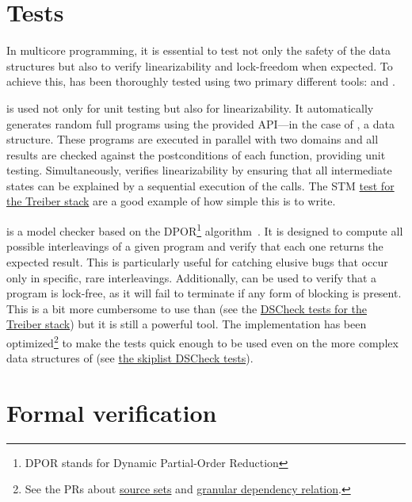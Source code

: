 \documentclass[a4paper, 11pt]{article}
\begin{document}
\section{Tests}

In multicore programming, it is essential to test not only the safety of the data structures but also to verify linearizability and lock-freedom when expected.
To achieve this, \Saturn has been thoroughly tested using two primary different tools: \DSCheck and \STM.

\STM is used not only for unit testing but also for linearizability.
It automatically generates random full programs using the provided API---in the case of \Saturn, a data structure.
These programs are executed in parallel with two domains and all results are checked against the postconditions of each function, providing unit testing.
Simultaneously, \STM verifies linearizability by ensuring that all intermediate states can be explained by a sequential execution of the calls. The STM \href{https://github.com/ocaml-multicore/saturn/blob/main/test/treiber_stack/stm_treiber_stack.ml}{test for the Treiber stack} are a good example of how simple this is to write.

\DSCheck is a model checker based on the DPOR\footnote[3]{DPOR stands for Dynamic Partial-Order Reduction} algorithm~\cite{dpor05}.
It is designed to compute all possible interleavings of a given program and verify that each one returns the expected result.
This is particularly useful for catching elusive bugs that occur only in specific, rare interleavings.
Additionally, \DSCheck can be used to verify that a program is lock-free, as it will fail to terminate if any form of blocking is present. This is a bit more cumbersome to use than \STM (see the \href{https://github.com/ocaml-multicore/saturn/blob/main/test/treiber_stack/treiber_stack_dscheck.ml}{DSCheck tests for the Treiber stack}) but it is still a powerful tool. The implementation has been optimized\footnote[4]{See the PRs about \href{https://github.com/ocaml-multicore/dscheck/pull/18}{source sets} and \href{https://github.com/ocaml-multicore/dscheck/pull/22}{granular dependency relation}.} to make the tests quick enough to be used even on the more complex data structures of \Saturn (see \href{https://github.com/ocaml-multicore/saturn/blob/main/test/skiplist/stm_skiplist.ml}{the skiplist DSCheck tests}).

\section{Formal verification}
\end{document}
